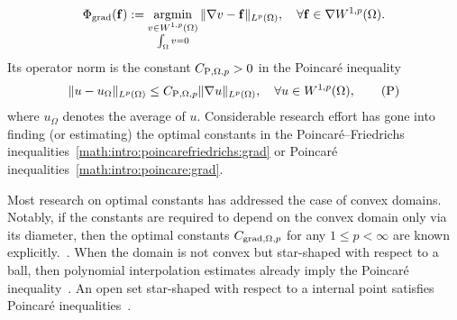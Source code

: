 \documentclass[12pt,a4paper]{article}
\begin{document}
\begin{align*}
    \Phi_{\operatorname{grad}}( {\mathbf f} ) 
    := 
    \operatorname*{{\rm argmin}}\limits_{ \substack{ v \in W^{1,p}(\Omega) \\ \int_\Omega v = 0 } } \| \nabla v - {\mathbf f} \|_{L^{p}(\Omega)},
    \quad 
    \forall 
    {\mathbf f} \in \nabla W^{1,p}(\Omega)
    .
\end{align*} 
Its operator norm is the constant $C_{{\rm P},\Omega,p} > 0$ in the Poincar\'e inequality 
\begin{align}\label{math:intro:poincare:grad}
    \| u - u_{\Omega} \|_{L^{p}(\Omega)}
    \leq 
    C_{{\rm P},\Omega,p} \| \nabla u \|_{L^p(\Omega)},
    \quad 
    \forall 
    u \in W^{1,p}(\Omega)
    , \tag{P} %
\end{align}
where $u_\Omega$ denotes the average of $u$.
Considerable research effort has gone into finding (or estimating) the optimal constants in the Poincar\'e--Friedrichs inequalities~\eqref{math:intro:poincarefriedrichs:grad} or Poincar\'e inequalities~\eqref{math:intro:poincare:grad}. 

Most research on optimal constants has addressed the case of convex domains. 
Notably, if the constants are required to depend on the convex domain only via its diameter, 
then the optimal constants $C_{\operatorname{grad},\Omega,p}$ for any $1 \leq p < \infty$ are known explicitly.~\cite{bebendorf2003note,acosta2004optimal,esposito2013poincare,ferone2012remark}.
When the domain is not convex but star-shaped with respect to a ball,
then polynomial interpolation estimates already imply the Poincar\'e inequality~\cite{brenner2008mathematical,ern2021finite}. 
An open set star-shaped with respect to a internal point satisfies Poincar\'e inequalities~\cite[Theorem~3.1]{hurri1988poincare}. 
\end{document}
